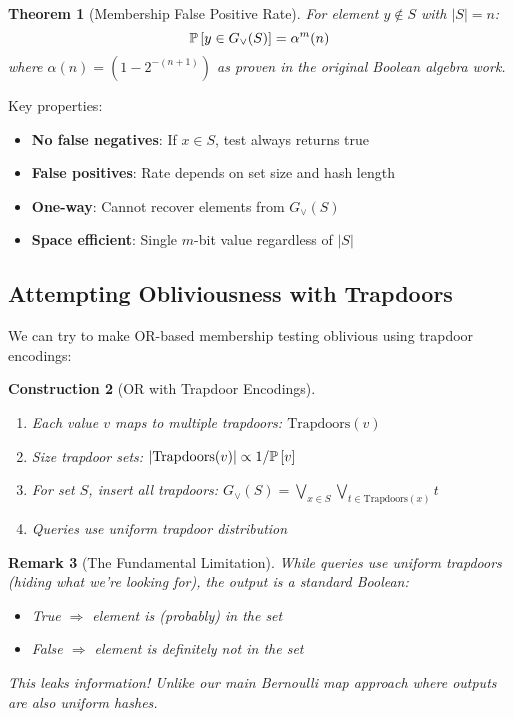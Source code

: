 \documentclass[11pt,final]{article}
\newcommand{\OR}{\lor}
\newtheorem{theorem}{Theorem}[section]
\newtheorem{remark}[theorem]{Remark}
\newtheorem{construction}[theorem]{Construction}
\begin{document}
\begin{theorem}[Membership False Positive Rate]
For element $y \notin S$ with $|S| = n$:
\begin{equation}
\Prob{y \in G_{\OR}(S)} = \alpha^m(n)
\end{equation}
where $\alpha(n) = (1 - 2^{-(n+1)})$ as proven in the original Boolean algebra work.
\end{theorem}

Key properties:
\begin{itemize}
    \item \textbf{No false negatives}: If $x \in S$, test always returns true
    \item \textbf{False positives}: Rate depends on set size and hash length
    \item \textbf{One-way}: Cannot recover elements from $G_{\OR}(S)$
    \item \textbf{Space efficient}: Single $m$-bit value regardless of $|S|$
\end{itemize}

\subsection{Attempting Obliviousness with Trapdoors}

We can try to make OR-based membership testing oblivious using trapdoor encodings:

\begin{construction}[OR with Trapdoor Encodings]
\begin{enumerate}
    \item Each value $v$ maps to multiple trapdoors: $\text{Trapdoors}(v)$
    \item Size trapdoor sets: $|\text{Trapdoors}(v)| \propto 1/\mathbb{P}\left[v\right]$
    \item For set $S$, insert all trapdoors: $G_{\OR}(S) = \bigvee_{x \in S} \bigvee_{t \in \text{Trapdoors}(x)} t$
    \item Queries use uniform trapdoor distribution
\end{enumerate}
\end{construction}

\begin{remark}[The Fundamental Limitation]
While queries use uniform trapdoors (hiding what we're looking for), the output is a standard Boolean:
\begin{itemize}
    \item True $\Rightarrow$ element is (probably) in the set
    \item False $\Rightarrow$ element is definitely not in the set
\end{itemize}
This leaks information! Unlike our main Bernoulli map approach where outputs are also uniform hashes.
\end{remark}
\end{document}
